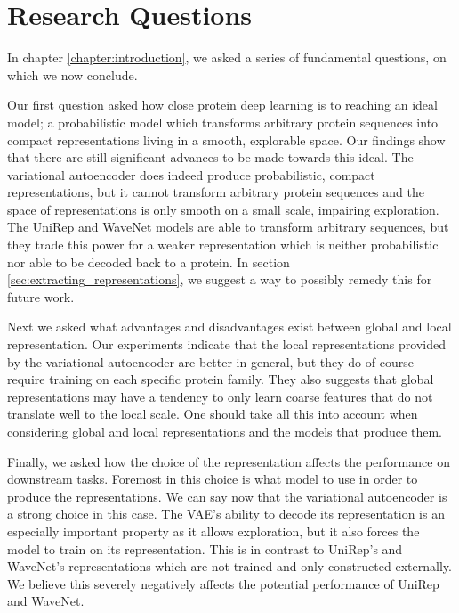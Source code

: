 \section{Research Questions}
In chapter \ref{chapter:introduction}, we asked a series of fundamental questions, on which we now conclude.

Our first question asked how close protein deep learning is to reaching an ideal model; a probabilistic model which transforms arbitrary protein sequences into compact representations living in a smooth, explorable space. Our findings show that there are still significant advances to be made towards this ideal. The variational autoencoder does indeed produce probabilistic, compact representations, but it cannot transform arbitrary protein sequences and the space of representations is only smooth on a small scale, impairing exploration. The UniRep and WaveNet models are able to transform arbitrary sequences, but they trade this power for a weaker representation which is neither probabilistic nor able to be decoded back to a protein. In section \ref{sec:extracting_representations}, we suggest a way to possibly remedy this for future work.


Next we asked what advantages and disadvantages exist between global and local representation. Our experiments indicate that the local representations provided by the variational autoencoder are better in general, but they do of course require training on each specific protein family. They also suggests that global representations may have a tendency to only learn coarse features that do not translate well to the local scale. One should take all this into account when considering global and local representations and the models that produce them.

Finally, we asked how the choice of the representation affects the performance on downstream tasks. Foremost in this choice is what model to use in order to produce the representations. We can say now that the variational autoencoder is a strong choice in this case. The VAE's ability to decode its representation is an especially important property as it allows exploration, but it also forces the model to train on its representation. This is in contrast to UniRep's and WaveNet's representations which are not trained and only constructed externally. We believe this severely negatively affects the potential performance of UniRep and WaveNet.

